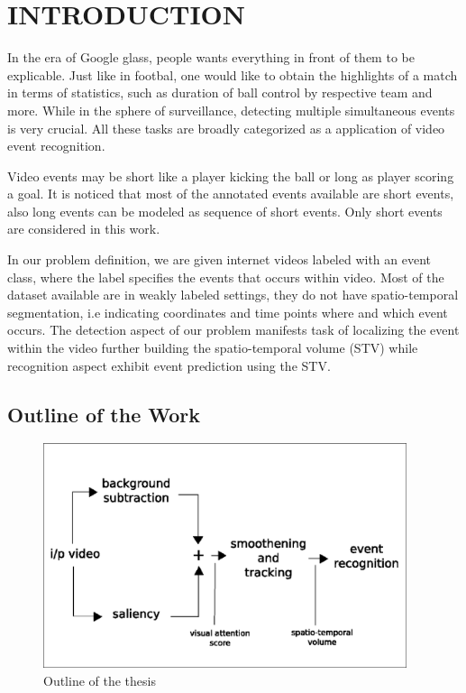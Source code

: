 \chapter{INTRODUCTION}
\label{chap:intro}
In the era of Google glass, people wants everything in front of them to be explicable. Just like in footbal, one would like to obtain the highlights of a match in terms of statistics, such as duration of ball control by respective team and more. While in the sphere of surveillance, detecting multiple simultaneous events is very crucial. All these tasks are broadly categorized as a application of video event recognition. 

\par Video events may be short like a player kicking the ball or  long as player scoring a goal. It is noticed that most of the annotated events available are short events, also long events can be modeled as sequence of short events. Only short events are considered in this work.

\par In our problem definition, we are given internet  videos labeled with an event class, where the label specifies the events that occurs within video. Most of the dataset available are in weakly labeled settings, they do not have spatio-temporal segmentation, i.e indicating coordinates and time points where and which event occurs.  The detection aspect of our problem manifests task of localizing the event within the video further building the spatio-temporal volume (STV) while recognition aspect exhibit event prediction using the STV.

\section{Outline of the Work}

\begin{figure}[htpb]
   \begin{center}
	    \includegraphics[width=0.95\textwidth]{snaps/outline.eps}     
     \caption {Outline of the thesis}
   \label{fig:outline}
   \end{center}
 \end{figure}

